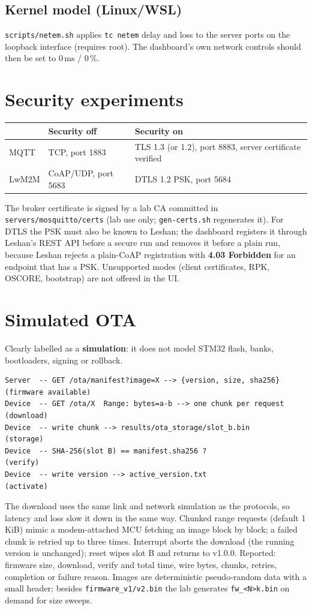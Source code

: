 \documentclass[11pt,a4paper]{article}
\newcommand{\code}[1]{\texttt{#1}}
\begin{document}
\subsection{Kernel model (Linux/WSL)}
\code{scripts/netem.sh} applies \code{tc netem} delay and loss to the server
ports on the loopback interface (requires root). The dashboard's own network
controls should then be set to 0\,ms / 0\,\%.

\section{Security experiments}
\begin{center}
\begin{tabular}{@{}lll@{}}
\toprule
 & Security off & Security on \\
\midrule
MQTT & TCP, port 1883 & TLS 1.3 (or 1.2), port 8883, server certificate verified \\
LwM2M & CoAP/UDP, port 5683 & DTLS 1.2 PSK, port 5684 \\
\bottomrule
\end{tabular}
\end{center}
The broker certificate is signed by a lab CA committed in
\code{servers/mosquitto/certs} (lab use only; \code{gen-certs.sh} regenerates
it). For DTLS the PSK must also be known to Leshan; the dashboard registers it
through Leshan's REST API before a secure run and removes it before a plain
run, because Leshan rejects a plain-CoAP registration with \textbf{4.03
Forbidden} for an endpoint that has a PSK. Unsupported modes (client
certificates, RPK, OSCORE, bootstrap) are not offered in the UI.

\section{Simulated OTA}
Clearly labelled as a \textbf{simulation}: it does not model STM32 flash,
banks, bootloaders, signing or rollback.
\begin{lstlisting}
Server  -- GET /ota/manifest?image=X --> {version, size, sha256}  (firmware available)
Device  -- GET /ota/X  Range: bytes=a-b --> one chunk per request  (download)
Device  -- write chunk --> results/ota_storage/slot_b.bin          (storage)
Device  -- SHA-256(slot B) == manifest.sha256 ?                    (verify)
Device  -- write version --> active_version.txt                    (activate)
\end{lstlisting}
The download uses the same link and network simulation as the protocols, so
latency and loss slow it down in the same way. Chunked range requests (default
1\,KiB) mimic a modem-attached MCU fetching an image block by block; a failed
chunk is retried up to three times. Interrupt aborts the download (the running
version is unchanged); reset wipes slot B and returns to v1.0.0. Reported:
firmware size, download, verify and total time, wire bytes, chunks, retries,
completion or failure reason. Images are deterministic pseudo-random data with
a small header; besides \code{firmware\_v1/v2.bin} the lab generates
\code{fw\_<N>k.bin} on demand for size sweeps.
\end{document}
